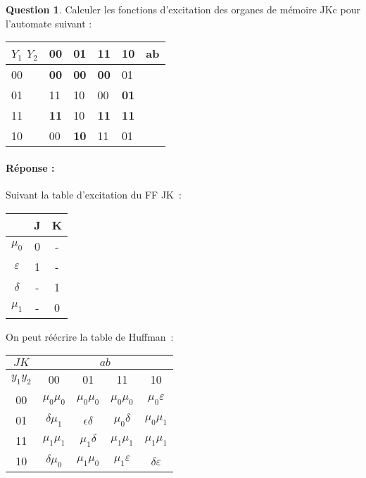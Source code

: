 \documentclass[11pt,a4paper]{article}
\theoremstyle{definition}%
\newtheorem{Q}{Question}[] %
\newcommand{\reponse}[1]{%
	\ifthenelse {\boolean{corrige}} {\paragraph{Réponse :} \color{darkblue}   #1\color{black}} {}
 }
\begin{document}
\begin{Q}
Calculer les fonctions d'excitation des organes de mémoire JKc pour l'automate suivant :


\begin{center}
	\begin{tabular}{|l|l|l|l|l|l}
	\hline
	$Y_1$ $Y_2$ & 00         & 01         & 11         & 10         & \multicolumn{1}{l|}{ab} \\ \hline
	00           & \textbf{00} & \textbf{00} & \textbf{00} & 01          &                         \\ \cline{1-5}
	01           & 11          & 10          & 00          & \textbf{01} &                         \\ \cline{1-5}
	11           & \textbf{11} & 10          & \textbf{11} & \textbf{11} &                         \\ \cline{1-5}
	10           & 00          & \textbf{10} & 11          & 01          &                         \\ \cline{1-5}
	\end{tabular}
\end{center}


\reponse{
	Suivant la table d'excitation du FF JK~:
	\begin{center}
		\begin{tabular}{c|cc}
			& J & K \\ \hline
			$\mu_0$ & 0 & - \\
			$\varepsilon$ & 1 & - \\
			$\delta$ & - & 1 \\
			$\mu_1$ & - & 0
		\end{tabular}
	\end{center}

	On peut réécrire la table de Huffman~:
	\begin{center}
		\begin{tabular}{|c|c|c|c|c|}\hline
		$JK$ & \multicolumn{4}{c|}{$ab$} \\ \hline
		$y_1y_2$ & 00 & 01 & 11 & 10 \\ \hline
		00 & $\mu_0\mu_0$ & $\mu_0\mu_0$ & $\mu_0\mu_0$ & $\mu_0\varepsilon$ \\ \hline
		01 & $\delta\mu_1$ & $\epsilon\delta$ & $\mu_0\delta$ & $\mu_0\mu_1$ \\ \hline
		11 & $\mu_1\mu_1$ & $\mu_1\delta$ & $\mu_1\mu_1$ & $\mu_1\mu_1$ \\ \hline
		10 & $\delta\mu_0$ & $\mu_1\mu_0$ & $\mu_1\varepsilon$ & $\delta\varepsilon$ \\ \hline
		\end{tabular}
	\end{center}

}
\end{Q}
\end{document}
